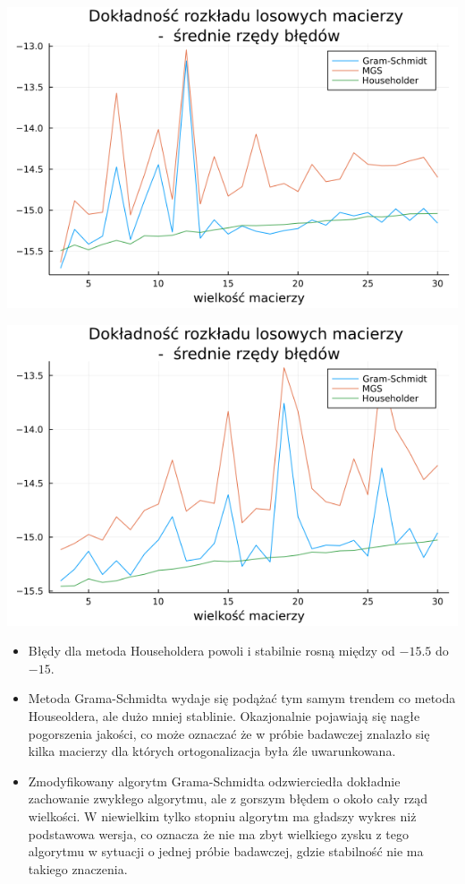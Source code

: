 \documentclass[11pt,wide]{mwart}
\begin{document}
\vspace{1cm}
\centerline{\includegraphics[scale=0.6]{random6}}
\vspace{1cm}
\centerline{\includegraphics[scale=0.6]{random3}}

\begin{itemize}
    \item Błędy dla metoda Householdera powoli i stabilnie rosną między od $-15.5$ do $-15$.
    \newline
    
    \item Metoda Grama-Schmidta wydaje się podążać tym samym trendem co metoda Houseoldera, ale dużo mniej stablinie. Okazjonalnie pojawiają się nagłe pogorszenia jakości, co może oznaczać że w próbie badawczej znalazło się kilka macierzy dla których ortogonalizacja była źle uwarunkowana.
    \newline
    
    \item Zmodyfikowany algorytm Grama-Schmidta odzwierciedła dokładnie zachowanie zwykłego algorytmu, ale z gorszym błędem o około cały rząd wielkości. W niewielkim tylko stopniu algorytm ma gładszy wykres niż podstawowa wersja, co oznacza że nie ma zbyt wielkiego zysku z tego algorytmu w sytuacji o jednej próbie badawczej, gdzie stabilność nie ma takiego znaczenia.
    \newline
    
\end{itemize}
\end{document}
